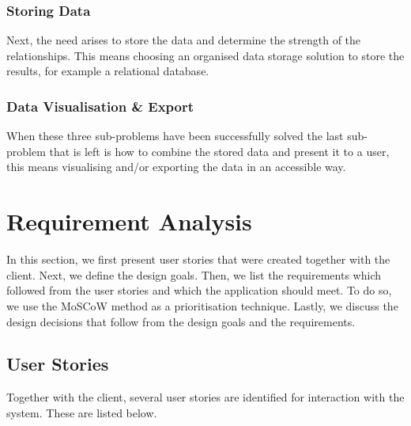 \subsubsection{Storing Data}
Next, the need arises to store the data and determine the strength of the relationships. This means choosing an organised data storage solution to store the results, for example a relational database.

\subsubsection{Data Visualisation \& Export}
When these three sub-problems have been successfully solved the last sub-problem that is left is how to combine the stored data and present it to a user, this means visualising and/or exporting the data in an accessible way.

\section{Requirement Analysis}\label{sec:reqs-analysis}
In this section, we first present user stories that were created together with the client. Next, we define the design goals. Then, we list the requirements which followed from the user stories and which the application should meet. To do so, we use the MoSCoW method\cite{clegg1994case} as a prioritisation technique. Lastly, we discuss the design decisions that follow from the design goals and the requirements.

\subsection{User Stories}
Together with the client, several user stories are identified for interaction with the system. These are listed below.


